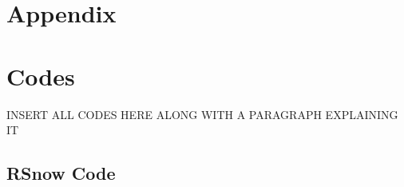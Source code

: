 \documentclass[11pt,letterpaper]{article}
\begin{document}
\newpage

\section{Appendix}

\appendix
\section{Codes} \label{App:AppendixA}

INSERT ALL CODES HERE ALONG WITH A PARAGRAPH EXPLAINING IT
\subsection{RSnow Code}
\end{document}
